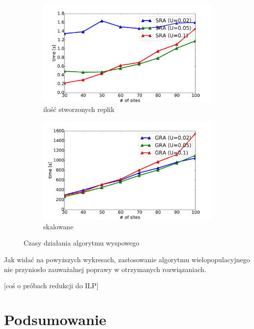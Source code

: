 \documentclass[11pt,pdftex,a4paper]{scrartcl}
\begin{document}
\begin{figure}[H]
    \centering
    \begin{subfigure}[b]{0.49\textwidth} 
        \includegraphics[width=\textwidth]{plots/time_sra_isl}
        \caption{ilość stworzonych replik}
    \end{subfigure}
    \begin{subfigure}[b]{0.49\textwidth}
        \includegraphics[width=\textwidth]{plots/time_gra_isl}
        \caption{skalowane}
    \end{subfigure}

    \caption{Czasy działania algorytmu wyspowego}
    \label{plot:original}
\end{figure}

Jak widać na powyższych wykresach, zastosowanie algorytmu wielopopulacyjnego nie przyniosło zauważalnej
poprawy w otrzymanych rozwiązaniach.

[coś o próbach redukcji do ILP]

\section{Podsumowanie}
\end{document}
